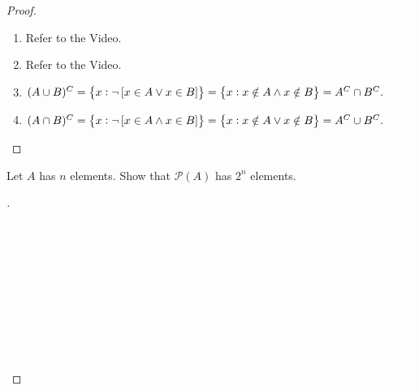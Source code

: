 \documentclass[11pt,openany]{article}
\begin{document}
\begin{proof}
{\color{white}	\begin{enumerate}[(1)]
		\item Refer to the Video.
		\item Refer to the Video.
		\item {$(A\cup B)^C=\set{x:\lnot\left[x\in A\lor x\in B\right]}=\set{x:x\notin A\land x\notin B}=A^C\cap B^C.$}
		\item {$(A\cap B)^C=\set{x:\lnot\left[x\in A\land x\in B\right]}=\set{x:x\notin A\lor x\notin B}=A^C\cup B^C.$}
	\end{enumerate}}
\vspace{40pt}
\end{proof}

\vfill
\begin{exercise*}
	Let $A$ has $n$ elements. Show that $\mathcal{P}(A)$ has $2^n$ elements.
	\begin{proof}[\sol] 
		\textcolor{white}{\begin{itemize}
			\item[(pf 1)] For each element of $A$, there are two choices:
			\begin{enumerate}
				\item Include the element in the subset.
				\item Exclude the element from the subset.
			\end{enumerate}
			Since we have two independent choices (include or exclude), the total number of subsets is:
			\[
			\underbrace{2\times 2\times\cdots 2}_{n\ \text{times}}=2^n.
			\]
		\end{itemize}}
	\end{proof}
\end{exercise*}
\end{document}

